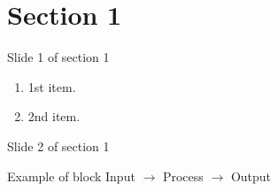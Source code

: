 \section{Section 1}



\begin{frame}{Slide 1 of section 1}
  \begin{enumerate}
    \item 1st item.
    \item 2nd item.
  \end{enumerate}
\end{frame}

\begin{frame}{Slide 2 of section 1}
  \begin{block}{Example of block}
    Input $\rightarrow$ Process $\rightarrow$ Output
  \end{block}
\end{frame}


